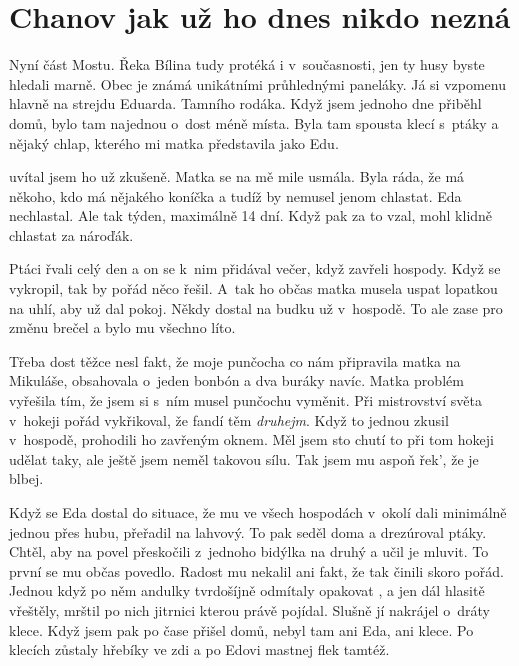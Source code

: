 
\chapter{Chanov jak už ho dnes nikdo nezná}

Nyní část Mostu. Řeka Bílina tudy protéká i v~současnosti, jen ty husy byste
hledali marně. Obec je známá unikátními průhlednými paneláky. Já si vzpomenu
hlavně na strejdu Eduarda. Tamního rodáka. Když jsem jednoho dne přiběhl domů,
bylo tam najednou o~dost méně místa. Byla tam spousta klecí s~ptáky a nějaký
chlap, kterého mi matka představila jako Edu.

 uvítal jsem ho už zkušeně. Matka se na mě mile usmála. Byla
ráda, že má někoho, kdo má nějakého koníčka a tudíž by nemusel jenom chlastat.
Eda nechlastal. Ale tak týden, maximálně 14 dní. Když pak za to vzal, mohl
klidně chlastat za nároďák.

Ptáci řvali celý den a on se k~nim přidával večer, když zavřeli hospody. Když
se vykropil, tak by pořád něco řešil. A~tak ho občas matka musela uspat
lopatkou na uhlí, aby už dal pokoj. Někdy dostal na budku už v~hospodě. To ale
zase pro změnu brečel a bylo mu všechno líto.

Třeba dost těžce nesl fakt, že moje punčocha co nám připravila matka na
Mikuláše, obsahovala o~jeden bonbón a dva buráky navíc. Matka problém vyřešila
tím, že jsem si s~ním musel punčochu vyměnit. Při mistrovství světa v~hokeji
pořád vykřikoval, že fandí těm {\em druhejm}. Když to jednou zkusil v~hospodě,
prohodili ho zavřeným oknem. Měl jsem sto chutí to při tom hokeji udělat taky,
ale ještě jsem neměl takovou sílu. Tak jsem mu aspoň řek', že je blbej.

Když se Eda dostal do situace, že mu ve všech hospodách v~okolí dali minimálně
jednou přes hubu, přeřadil na lahvový. To pak seděl doma a drezúroval ptáky.
Chtěl, aby na povel přeskočili z~jednoho bidýlka na druhý a učil je mluvit. To
první se mu občas povedlo. Radost mu nekalil ani fakt, že tak činili skoro
pořád. Jednou když po něm andulky tvrdošíjně odmítaly opakovat , a
jen dál hlasitě vřeštěly, mrštil po nich jitrnici kterou právě pojídal. Slušně
jí nakrájel o~dráty klece. Když jsem pak po čase přišel domů, nebyl tam ani
Eda, ani klece. Po klecích zůstaly hřebíky ve zdi a po Edovi mastnej flek
tamtéž.

